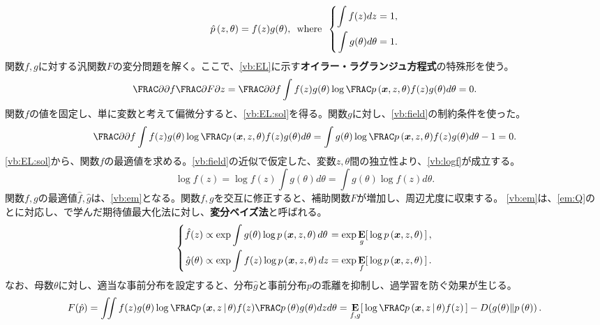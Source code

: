 \documentclass[10pt,a4paper]{book}
\begin{document}
%
\begin{equation}
\label{eq:vb:field}
\hatprob{z,\theta} = f(z)g(\theta),
\where
\left\{
\begin{aligned}
\int f(z) dz &= 1,\\
\int g(\theta) d\theta &= 1.
\end{aligned}
\right.
\end{equation}
%
関数$f,g$に対する汎関数$F$の変分問題を解く。ここで、\eqref{vb:EL}に示す\textbf{オイラー・ラグランジュ方程式}の特殊形を使う。
%
\begin{equation}
\label{eq:vb:EL}
\pdiff{}{f} \pdiff{F}{z} =
\pdiff{}{f} \int f(z) g(\theta) \log \frac{\prob{\bm{x},z,\theta}}{f(z)g(\theta)} d\theta = 0.
\end{equation}
%
関数$f$の値を固定し、単に変数と考えて偏微分すると、\eqref{vb:EL:sol}を得る。関数$g$に対し、\eqref{vb:field}の制約条件を使った。
%
\begin{equation}
\label{eq:vb:EL:sol}
\pdiff{}{f} \int f(z) g(\theta) \log \frac{\prob{\bm{x},z,\theta}}{f(z)g(\theta)} d\theta =
\int g(\theta) \log \frac{\prob{\bm{x},z,\theta}}{f(z)g(\theta)} d\theta - 1 = 0.
\end{equation}
%
\eqref{vb:EL:sol}から、関数$f$の最適値を求める。\eqref{vb:field}の近似で仮定した、変数$z,\theta$間の独立性より、\eqref{vb:logf}が成立する。
%
\begin{equation}
\label{eq:vb:logf}
\log f(z) =
\log f(z) \int g(\theta) d\theta =
\int g(\theta) \log f(z) d\theta.
\end{equation}
%
関数$f,g$の最適値$\hat{f},\hat{g}$は、\eqref{vb:em}となる。関数$f,g$を交互に修正すると、補助関数$F$が増加し、周辺尤度に収束する。
\eqref{vb:em}は、\eqref{em:Q}の\Estep{}と\Mstep{}に対応し、で学んだ期待値最大化法に対し、\textbf{変分ベイズ法}と呼ばれる。
%
\begin{equation}
\label{eq:vb:em}
\left\{
\begin{alignedat}{2}
\hat{f}(z) &\propto \exp \int g(\theta) \log \prob{\bm{x},z,\theta} d\theta &&= \exp \E[g]{\log \prob{\bm{x},z,\theta}},\\
\hat{g}(\theta) &\propto \exp \int f(z) \log \prob{\bm{x},z,\theta} dz &&= \exp \E[f]{\log \prob{\bm{x},z,\theta}}.
\end{alignedat}
\right.
\end{equation}
%
なお、母数$\theta$に対し、適当な事前分布を設定すると、分布$\hat{g}$と事前分布$p$の乖離を抑制し、過学習を防ぐ効果が生じる。
%
\begin{equation}
\label{eq:vb:penalty}
F(\hatp) =
\iint f(z)g(\theta) \log \frac{\prob{\bm{x},z}[\theta]}{f(z)} \frac{\prob{\theta}}{g(\theta)} dz d\theta =
\E[f,g]{\log \frac{\prob{\bm{x},z}[\theta]}{f(z)}} - \KL{g(\theta)}{\prob{\theta}}.
\end{equation}
\end{document}
